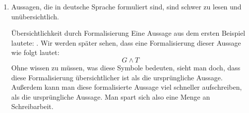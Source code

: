 \documentclass[../../main.tex]{subfiles}
\begin{document}
\begin{enumerate}
\begin{example}{Mehrdeutigkeit in der deutschen Sprache}
        \end{example}
        Die mathematische Schreibweise für Aussagen wird dieses Problem der Uneindeutigkeit beheben.
    \item Aussagen, die in deutsche Sprache formuliert sind, sind schwer zu lesen und unübersichtlich.
    \begin{example}{Übersichtlichkeit durch Formalisierung}
        Eine Aussage aus dem ersten Beispiel lautete: . Wir werden später sehen, dass eine Formalisierung dieser Aussage wie folgt lautet:
        \[ G \land T\]
        Ohne wissen zu müssen, was diese Symbole bedeuten, sieht man doch, dass diese Formalisierung übersichtlicher ist als die ursprüngliche Aussage. Außerdem kann man diese formalisierte Aussage viel schneller aufschreiben, als die ursprüngliche Aussage. Man spart sich also eine Menge an Schreibarbeit.
    \end{example}
\end{enumerate}
\end{document}
